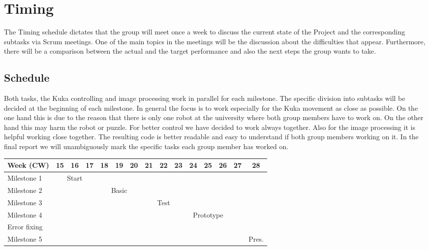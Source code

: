 \documentclass[a4paper, 12pt]{scrartcl}%
\begin{document}
	\section{Timing}
	The Timing schedule dictates that the group will meet once a week to discuss the current state of the Project and the corresponding subtasks via Scrum meetings. One of the main topics in the meetings will be the discussion about the difficulties that appear. Furthermore, there will be a comparison between the actual and the target performance and also the next steps the group wants to take.\newline
	
	
	\subsection*{Schedule}
	Both tasks, the Kuka controlling and image processing work in parallel for each milestone. The specific division into subtasks will be decided at the beginning of each milestone. In general the focus is to work especially for the Kuka movement as close as possible. On the one hand this is due to the reason that there is only one robot at the university where both group members have to work on. On the other hand this may harm the robot or puzzle. For better control we have decided to work always together.\newline
	Also for the image processing it is helpful working close together. The resulting code is better readable and easy to understand if both group members working on it.\newline
	In the final report we will unambiguously mark the specific tasks each group member has worked on.
	\begin{center}
		\begin{footnotesize}
			\begin{tabular}{|l|c|c|c|c|c|c|c|c|c|c|c|c|c|c|}
				\hline
				Week (CW) & 15 & 16 & 17 & 18 & 19 & 20 & 21 & 22 & 23 & 24 & 25 & 26 & 27 & 28 \\
				\hline
				Milestone 1      & \multicolumn{3}{c|}{Start}&\multicolumn{11}{c|}{}\\
				\hline
				Milestone 2      & \multicolumn{3}{c|}{}&\multicolumn{3}{c|}{Basic}&\multicolumn{8}{c|}{}\\
				\hline
				Milestone 3      & \multicolumn{6}{c|}{}&\multicolumn{3}{c|}{Test}&\multicolumn{5}{c|}{}\\
				\hline
				Milestone 4      & \multicolumn{9}{c|}{}&\multicolumn{3}{c|}{Prototype}&\multicolumn{2}{c|}{}\\
				\hline
				Error fixing     & \multicolumn{12}{c|}{}&\multicolumn{1}{c|}{}&\multicolumn{1}{c|}{}\\
				\hline
				Milestone 5      & \multicolumn{13}{c|}{}&\multicolumn{1}{c|}{Pres.}\\
				\hline
			\end{tabular}
		\end{footnotesize}
	\end{center}
	
\end{document}
